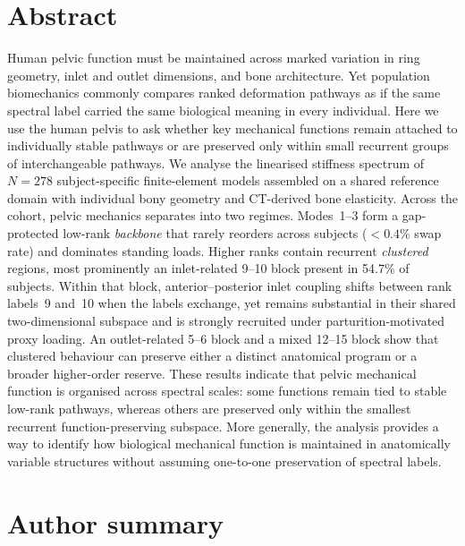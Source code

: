 \documentclass[11pt]{article}
\begin{document}
\section*{Abstract}
Human pelvic function must be maintained across marked variation in ring geometry, inlet and outlet dimensions, and bone architecture.
Yet population biomechanics commonly compares ranked deformation pathways as if the same spectral label carried the same biological meaning in every individual.
Here we use the human pelvis to ask whether key mechanical functions remain attached to individually stable pathways or are preserved only within small recurrent groups of interchangeable pathways.
We analyse the linearised stiffness spectrum of $N{=}278$ subject-specific finite-element models assembled on a shared reference domain with individual bony geometry and CT-derived bone elasticity.
Across the cohort, pelvic mechanics separates into two regimes.
Modes~1--3 form a gap-protected low-rank \emph{backbone} that rarely reorders across subjects ($<0.4\%$ swap rate) and dominates standing loads.
Higher ranks contain recurrent \emph{clustered} regions, most prominently an inlet-related 9--10 block present in 54.7\% of subjects.
Within that block, anterior--posterior inlet coupling shifts between rank labels~9 and~10 when the labels exchange, yet remains substantial in their shared two-dimensional subspace and is strongly recruited under parturition-motivated proxy loading.
An outlet-related 5--6 block and a mixed 12--15 block show that clustered behaviour can preserve either a distinct anatomical program or a broader higher-order reserve.
These results indicate that pelvic mechanical function is organised across spectral scales: some functions remain tied to stable low-rank pathways, whereas others are preserved only within the smallest recurrent function-preserving subspace.
More generally, the analysis provides a way to identify how biological mechanical function is maintained in anatomically variable structures without assuming one-to-one preservation of spectral labels.

\section*{Author summary}
\end{document}
